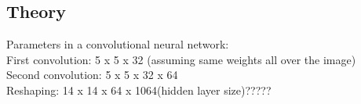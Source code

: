 \documentclass[paper=a4, fontsize=11pt]{scrartcl} %
\numberwithin{equation}{section} %
\numberwithin{figure}{section} %
\numberwithin{table}{section} %
\begin{document}
\subsection{Theory}
Parameters in a convolutional neural network: \\
First convolution: 5 x 5 x 32 (assuming same weights all over the image) \\
Second convolution: 5 x 5 x 32 x 64 \\
Reshaping: 14 x 14 x 64 x 1064(hidden layer size)?????





\end{document}
